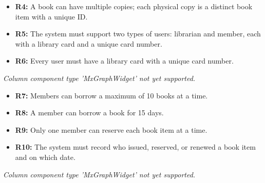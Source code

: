 \noindent
\begin{minipage}[t]{0.48\textwidth}\vspace{0pt}
\begin{itemize}
\item
\textbf{R4:} A book can have multiple copies; each physical copy is a distinct book item with a unique ID.
\item
\textbf{R5:} The system must support two types of users: librarian and member, each with a library card and a unique card number.
\item
\textbf{R6:} Every user must have a library card with a unique card number.
\end{itemize}
\end{minipage}
\hfill
\begin{minipage}[t]{0.48\textwidth}\vspace{0pt}
\textit{Column component type 'MxGraphWidget' not yet supported.}
\end{minipage}

\noindent
\begin{minipage}[t]{0.48\textwidth}\vspace{0pt}
\begin{itemize}
\item
\textbf{R7:} Members can borrow a maximum of 10 books at a time.
\item
\textbf{R8:} A member can borrow a book for 15 days.
\item
\textbf{R9:} Only one member can reserve each book item at a time.
\item
\textbf{R10:} The system must record who issued, reserved, or renewed a book item and on which date.
\end{itemize}
\end{minipage}
\hfill
\begin{minipage}[t]{0.48\textwidth}\vspace{0pt}
\textit{Column component type 'MxGraphWidget' not yet supported.}
\end{minipage}

